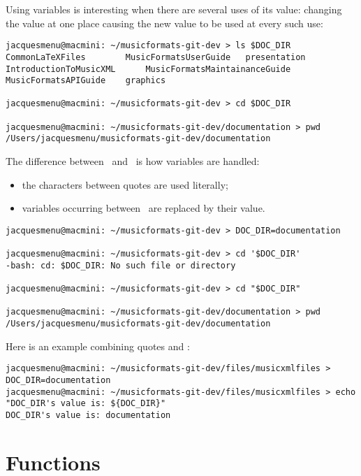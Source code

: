 Using variables is interesting when there are several uses of its value: changing the value at one place causing the new value to be used at every such use:
\begin{lstlisting}[language=Terminal]
jacquesmenu@macmini: ~/musicformats-git-dev > ls $DOC_DIR
CommonLaTeXFiles		MusicFormatsUserGuide	presentation
IntroductionToMusicXML		MusicFormatsMaintainanceGuide
MusicFormatsAPIGuide	graphics

jacquesmenu@macmini: ~/musicformats-git-dev > cd $DOC_DIR

jacquesmenu@macmini: ~/musicformats-git-dev/documentation > pwd
/Users/jacquesmenu/musicformats-git-dev/documentation
\end{lstlisting}

The difference between \quotes\ and \doubleQuotes\ is how variables are handled:
\begin{itemize}
\item the characters between quotes are used literally;
\item variables occurring between \doubleQuotes\ are replaced by their value.
\end{itemize}

\begin{lstlisting}[language=Terminal]
jacquesmenu@macmini: ~/musicformats-git-dev > DOC_DIR=documentation

jacquesmenu@macmini: ~/musicformats-git-dev > cd '$DOC_DIR'
-bash: cd: $DOC_DIR: No such file or directory

jacquesmenu@macmini: ~/musicformats-git-dev > cd "$DOC_DIR"

jacquesmenu@macmini: ~/musicformats-git-dev/documentation > pwd
/Users/jacquesmenu/musicformats-git-dev/documentation
\end{lstlisting}

Here is an example combining quotes and \doubleQuotes:
\begin{lstlisting}[language=Terminal]
jacquesmenu@macmini: ~/musicformats-git-dev/files/musicxmlfiles > DOC_DIR=documentation
jacquesmenu@macmini: ~/musicformats-git-dev/files/musicxmlfiles > echo "DOC_DIR's value is: ${DOC_DIR}"
DOC_DIR's value is: documentation
\end{lstlisting}


\section{Functions}

